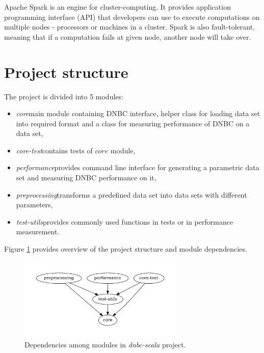 \documentclass[thesis=B,english]{FITthesis}[2012/06/26]
\begin{document}
Apache Spark is an engine for cluster-computing. It provides application programming interface (API) that developers can use to execute computations on multiple nodes - processors or machines in a cluster. Spark is also fault-tolerant, meaning that if a computation fails at given node, another node will take over.

\section{Project structure}

The project is divided into 5 modules:

\begin{itemize}

\item \textit{core}\textemdash main module containing DNBC interface, helper class for loading data set into required format and a class for measuring performance of DNBC on a data set,
\item \textit{core-test}\textemdash contains tests of $core$ module,
\item \textit{performance}\textemdash provides command line interface for generating a parametric data set and measuring DNBC performance on it,
\item \textit{preprocessing}\textemdash transforms a predefined data set into data sets with different parameters,
\item \textit{test-utils}\textemdash provides commonly used functions in tests or in performance measurement.

\end{itemize}

Figure \ref{fig:module-dependencies} provides overview of the project structure and module dependencies.

\begin{figure}
	\centering
 	\includegraphics[width=0.7\textwidth]{module-dependencies}
 	\caption{Dependencies among modules in \textit{dnbc-scala} project.}
 	\label{fig:module-dependencies}
\end{figure}
\end{document}
